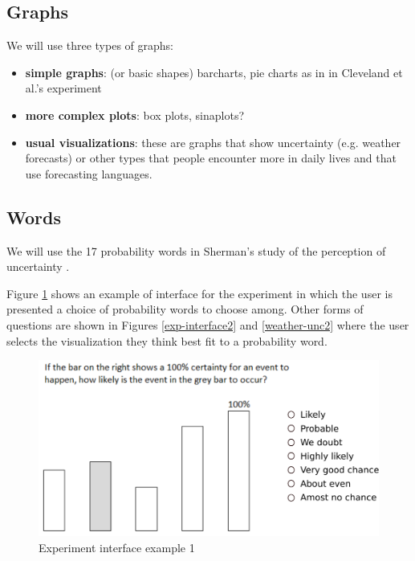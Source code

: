 \documentclass{proc}
\begin{document}
\subsection{Graphs}
We will use three types of graphs: 

\begin{itemize}
    \item \textbf{simple graphs}: (or basic shapes) barcharts, pie charts as in in Cleveland et al.'s experiment \cite{cleveland1984graphical}
    \item \textbf{more complex plots}: box plots, sinaplots\cite{sidiropoulos2018sinaplot}?
    \item \textbf{usual visualizations}: these are graphs that show uncertainty (e.g. weather forecasts) or other types that people encounter more in daily lives and that use forecasting languages.  
\end{itemize}

\subsection{Words}
We will use the 17 probability words in Sherman's study of the perception of uncertainty \cite{desjardins2017measuring}.


Figure \ref{exp-interface1} shows an example of interface for the experiment in which the user is presented a choice of probability words to choose among.  
Other forms of questions are shown in Figures \ref{exp-interface2} and \ref{weather-unc2} where the user selects the visualization they think best fit to a probability word. 

\begin{figure}[!t]
    \centering
    \includegraphics[width=\columnwidth]{figures/exp-int1.pdf}
    \caption{Experiment interface example 1}
    \label{exp-interface1}
\end{figure}
\end{document}
